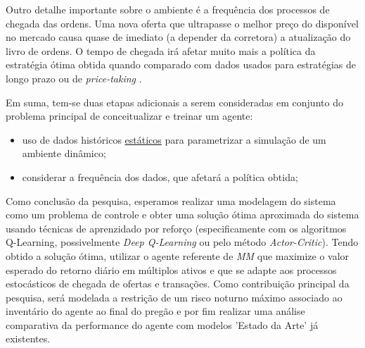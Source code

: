 Outro detalhe importante sobre o ambiente é a frequência dos processos de chegada das ordens. Uma nova oferta que ultrapasse o melhor preço do disponível no mercado causa quase de imediato (a depender da corretora) a atualização do livro de ordens. O tempo de chegada irá afetar muito mais a política da estratégia ótima obtida quando comparado com dados usados para estratégias de longo prazo ou de \textit{price-taking} \citep{2306.17179}.

Em suma, tem-se duas etapas adicionais a serem consideradas em conjunto do problema principal de conceitualizar e treinar um agente: 
\begin{itemize}
    \item uso de dados históricos \underline{estáticos} para parametrizar a simulação de um ambiente dinâmico;
    \item considerar a frequência dos dados,  que afetará a política obtida;
\end{itemize}

Como conclusão da pesquisa, esperamos realizar uma modelagem do sistema como um problema de controle e obter uma solução ótima aproximada do sistema usando técnicas de aprenzidado por reforço (especificamente com os algoritmos Q-Learning, possivelmente \textit{Deep Q-Learning} ou pelo método \textit{Actor-Critic}). Tendo obtido a solução ótima, utilizar o agente referente de \textit{MM} que maximize o valor esperado do retorno diário em múltiplos ativos e que se adapte aos processos estocásticos de chegada de ofertas e transações. Como contribuição principal da pesquisa, será modelada a restrição de um risco noturno máximo associado ao inventário do agente ao final do pregão e por fim realizar uma análise comparativa da performance do agente com modelos 'Estado da Arte' já existentes.
